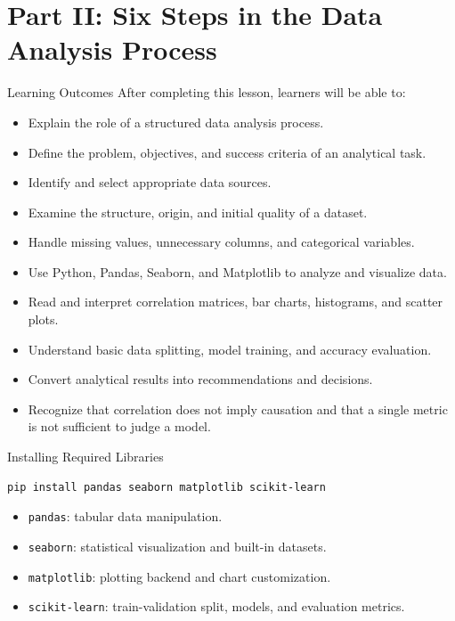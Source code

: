 \documentclass[aspectratio=169,11pt]{beamer}
\begin{document}
\section{Part II: Six Steps in the Data Analysis Process}


\begin{frame}{Learning Outcomes}
After completing this lesson, learners will be able to:
\begin{itemize}\small
  \item Explain the role of a structured data analysis process.
  \item Define the problem, objectives, and success criteria of an analytical task.
  \item Identify and select appropriate data sources.
  \item Examine the structure, origin, and initial quality of a dataset.
  \item Handle missing values, unnecessary columns, and categorical variables.
  \item Use Python, Pandas, Seaborn, and Matplotlib to analyze and visualize data.
  \item Read and interpret correlation matrices, bar charts, histograms, and scatter plots.
  \item Understand basic data splitting, model training, and accuracy evaluation.
  \item Convert analytical results into recommendations and decisions.
  \item Recognize that correlation does not imply causation and that a single metric is not sufficient to judge a model.
\end{itemize}
\end{frame}


\begin{frame}[fragile]{Installing Required Libraries}
\begin{lstlisting}[style=py]
pip install pandas seaborn matplotlib scikit-learn
\end{lstlisting}
\begin{itemize}
  \item \texttt{pandas}: tabular data manipulation.
  \item \texttt{seaborn}: statistical visualization and built-in datasets.
  \item \texttt{matplotlib}: plotting backend and chart customization.
  \item \texttt{scikit-learn}: train-validation split, models, and evaluation metrics.
\end{itemize}
\end{frame}
\end{document}
